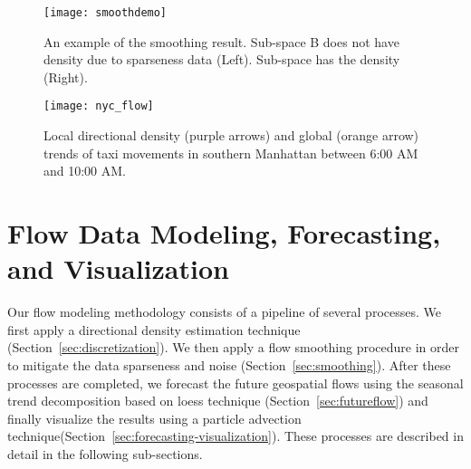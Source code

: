 \begin{figure}[tb]
	\centering
	\texttt{[image: smoothdemo]}
	\caption{An example of the smoothing result. Sub-space B does not have density due to sparseness data (Left). Sub-space has the density (Right).}
	\label{fig:smoothdemo}
\end{figure}


\begin{figure}[tb]
	\centering
	\texttt{[image: nyc\_flow]}
	\caption{Local directional density (purple arrows) and global (orange arrow) trends of taxi movements in southern Manhattan between 6:00 AM and 10:00 AM.}
	\label{fig:taxi_glyph}
\end{figure}



\section{Flow Data Modeling, Forecasting, and Visualization}

Our flow modeling methodology consists of a pipeline of several processes.
We first apply a directional density estimation technique (Section~\ref{sec:discretization}). 
We then apply a flow smoothing procedure in order to mitigate the data sparseness and noise (Section~\ref{sec:smoothing}).
After these processes are completed, we forecast the future geospatial flows using the seasonal trend decomposition based on loess technique (Section~\ref{sec:futureflow}) and finally visualize the results using a particle advection technique(Section~\ref{sec:forecasting-visualization}). %
These processes are described in detail in the following sub-sections. 



